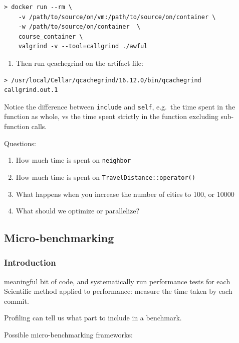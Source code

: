 \begin{verbatim}
> docker run --rm \
    -v /path/to/source/on/vm:/path/to/source/on/container \
    -w /path/to/source/on/container  \
    course_container \
    valgrind -v --tool=callgrind ./awful
\end{verbatim}

\begin{enumerate}
\def\labelenumi{\arabic{enumi}.}
\itemsep1pt\parskip0pt
\item
  Then run qcachegrind on the artifact file:
\end{enumerate}

\begin{verbatim}
> /usr/local/Cellar/qcachegrind/16.12.0/bin/qcachegrind callgrind.out.1
\end{verbatim}

Notice the difference between \texttt{include} and \texttt{self},
e.g.~the time spent in the function as whole, vs the time spent strictly
in the function excluding sub-function calls.

Questions:

\begin{enumerate}
\def\labelenumi{\arabic{enumi}.}
\itemsep1pt\parskip0pt
\item
  How much time is spent on \texttt{neighbor}
\item
  How much time is spent on \texttt{TravelDistance::operator()}
\item
  What happens when you increase the number of cities to 100, or 10000
\item
  What should we optimize or parallelize?
\end{enumerate}

\subsection{Micro-benchmarking}\label{micro-benchmarking}

\subsubsection{Introduction}\label{introduction-2}

meaningful bit of code, and systematically run performance tests for
each Scientific method applied to performance: measure the time taken by
each commit.

Profiling can tell us what part to include in a benchmark.

Possible micro-benchmarking frameworks:

